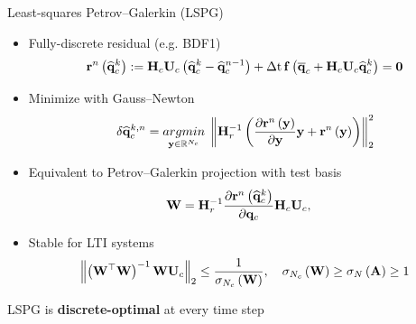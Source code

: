 \documentclass[]{beamer}
\begin{document}
\begin{frame}{Least-squares Petrov--Galerkin (LSPG)}
	\small
    \begin{itemize}
		\item Fully-discrete residual (e.g. BDF1)
		\begin{equation*}
			\resFuncIter{\timeIdx}{\consVecCoef^{\newtonIdx}} \defEq \consScale \consTrial \left( \consVecCoef^{\newtonIdx} - \consVecCoef^{\timeIdx-1} \right) + \dt \, \rhsFunc{\consVecCent + \consScale \consTrial \consVecCoef^{\newtonIdx}} = \zeroVec
		\end{equation*}
		\item Minimize with Gauss--Newton
		\begin{equation*}
			\delta \consVecCoef^{\newtonIdx, \timeIdx} = \argmin{\dummyVec \in \mathbb{R}^{\numConsModes}} \norm{\resScaleInv \left(\pde{\resFuncIter{\timeIdx}{\dummyVec}}{\dummyVec} \dummyVec + \resFuncIter{\timeIdx}{\dummyVec}\right)}_2^2
		\end{equation*}
		\item Equivalent to Petrov--Galerkin projection with test basis\footnotemark[2]
		\begin{equation*}
			\testBasis = \resScaleInv \pde{\resFuncIter{\timeIdx}{\consVecCoef^{\newtonIdx}}}{\consVec} \consScale \consTrial, \quad 
		\end{equation*}
		\vspace{-2em}
		\item Stable for LTI systems
		\begin{equation*}
			\left\Vert \left(\testBasis^\top \testBasis\right)^{-1} \testBasis \consTrial \right\Vert_2 \le \frac{1}{\sigma_{\numConsModes}\left(\testBasis\right)}, \quad \sigma_{\numConsModes}\left(\testBasis\right) \ge \sigma_{\numDOF}\left(\mathbf{A}\right) \ge 1 
		\end{equation*}
	\end{itemize}
	\vspace{-1em}
	\begin{tcolorbox}[colframe=blue!50!white,halign=center]
		LSPG is \textbf{discrete-optimal} at every time step
	\end{tcolorbox}
	\normalsize
\end{frame}
\end{document}

